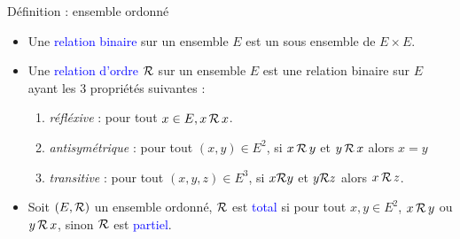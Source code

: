 \documentclass[10pt]{beamer}
\begin{document}
\begin{frame}[fragile]{\Ctitle}{\stitle}
	\begin{alertblock}{Définition : ensemble ordonné}
		\begin{itemize}
			\item<1-> Une \textcolor{blue}{relation binaire} sur un ensemble $E$ est un sous ensemble de $E \times E$.
			\item<2-> Une \textcolor{blue}{relation d'ordre} $\mathcal{R}$ sur un ensemble $E$ est une relation binaire sur $E$ ayant les 3 propriétés suivantes :
				\begin{enumerate}
					\item<3-> \textit{réfléxive} : pour tout $x \in E, x \, \mathcal{R}\, x$.
					\item<4-> \textit{antisymétrique} : pour tout $(x,y) \in E^2$, si $x \, \mathcal{R}\, y$ et $y \, \mathcal{R}\, x$ alors $x=y$
					\item<5-> \textit{transitive} : pour tout $(x,y,z) \in E^3$, si $x \mathcal{R} y$ et $y \mathcal{R} z$ alors $x \, \mathcal{R}\, z$.
				\end{enumerate}
			\item<7-> Soit $(E,\mathcal{R})$ un ensemble ordonné,  $\mathcal{R}$ est  \textcolor{blue}{total} si pour tout $x,y \in E^2$, $x \, \mathcal{R}\, y$ ou $y \, \mathcal{R}\, x$, sinon $\mathcal{R}$ est \textcolor{blue}{partiel}.
		\end{itemize}
	\end{alertblock}
\end{frame}
\end{document}
